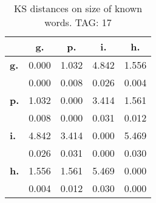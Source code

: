 \begin{table}[h!]
\begin{center}
\begin{tabular}{| l || c | c | c | c |}\hline
 & {\bf g.} & {\bf p.} & {\bf i.} & {\bf h.} \\\hline\hline
{\bf g.} & 0.000 & 1.032 & 4.842 & 1.556 \\
{\bf } & 0.000 & 0.008 & 0.026 & 0.004 \\\hline
{\bf p.} & 1.032 & 0.000 & 3.414 & 1.561 \\
{\bf } & 0.008 & 0.000 & 0.031 & 0.012 \\\hline
{\bf i.} & 4.842 & 3.414 & 0.000 & 5.469 \\
{\bf } & 0.026 & 0.031 & 0.000 & 0.030 \\\hline
{\bf h.} & 1.556 & 1.561 & 5.469 & 0.000 \\
{\bf } & 0.004 & 0.012 & 0.030 & 0.000 \\\hline
\end{tabular}
\caption{KS distances on size of known words. TAG: 17}
\end{center}
\end{table}